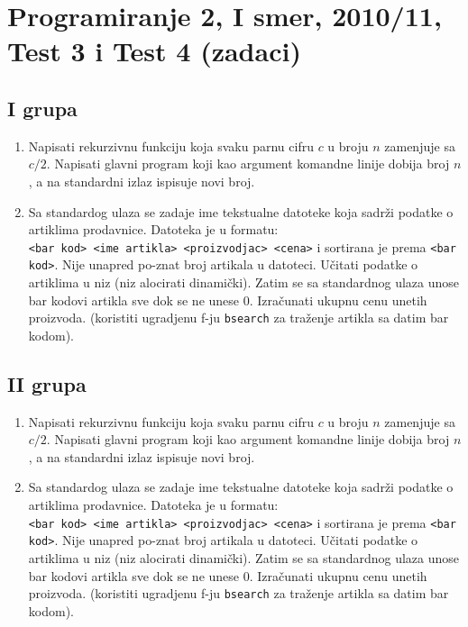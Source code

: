 \section{Programiranje 2, I smer, 2010/11, Test 3 i Test 4 (zadaci)}

\subsection{I grupa}
\begin{enumerate}
 \item Napisati rekurzivnu funkciju koja svaku parnu cifru $c$ u broju $n$ zamenjuje sa $c/2$.
       Napisati glavni program koji kao argument komandne linije dobija broj $n$, a na standardni izlaz
       ispisuje novi broj.

  \item Sa standardog ulaza se zadaje ime tekstualne datoteke koja sadr\v zi podatke o
    artiklima prodavnice. Datoteka je u formatu:\\
    \verb|<bar kod> <ime artikla> <proizvodjac> <cena>|
    i sortirana je prema \verb|<bar kod>|.
    Nije unapred po-znat broj artikala u datoteci.
    U\v citati podatke o artiklima u niz (niz alocirati dinami\v cki).
    Zatim se sa standardnog ulaza unose bar kodovi artikla sve dok se ne unese 0.
    Izra\v cunati ukupnu cenu unetih proizvoda.
    (koristiti ugradjenu f-ju \verb|bsearch| za tra\v zenje artikla sa datim bar kodom).
\end{enumerate}


\subsection{II grupa}
\begin{enumerate}
 \item Napisati rekurzivnu funkciju koja svaku parnu cifru $c$ u broju $n$ zamenjuje sa $c/2$.
       Napisati glavni program koji kao argument komandne linije dobija broj $n$, a na standardni izlaz
       ispisuje novi broj.

  \item Sa standardog ulaza se zadaje ime tekstualne datoteke koja sadr\v zi podatke o
    artiklima prodavnice. Datoteka je u formatu:\\
    \verb|<bar kod> <ime artikla> <proizvodjac> <cena>|
    i sortirana je prema \verb|<bar kod>|.
    Nije unapred po-znat broj artikala u datoteci.
    U\v citati podatke o artiklima u niz (niz alocirati dinami\v cki).
    Zatim se sa standardnog ulaza unose bar kodovi artikla sve dok se ne unese 0.
    Izra\v cunati ukupnu cenu unetih proizvoda.
    (koristiti ugradjenu f-ju \verb|bsearch| za tra\v zenje artikla sa datim bar kodom).
\end{enumerate}



